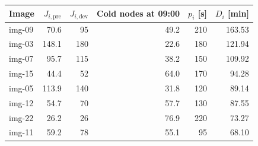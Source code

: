 \begin{tabular}{lrrrrr}
\toprule
Image & \(J_{i,\mathrm{pre}}\) & \(J_{i,\mathrm{dev}}\) & Cold nodes at 09:00 & \(p_i\) [s] & \(D_i\) [min] \\
\midrule
img-09 & 70.6 & 95 & 49.2 & 210 & 163.53 \\
img-03 & 148.1 & 180 & 22.6 & 180 & 121.94 \\
img-07 & 95.7 & 115 & 38.2 & 150 & 109.92 \\
img-15 & 44.4 & 52 & 64.0 & 170 & 94.28 \\
img-05 & 113.9 & 140 & 31.8 & 120 & 89.14 \\
img-12 & 54.7 & 70 & 57.7 & 130 & 87.55 \\
img-22 & 26.2 & 26 & 76.9 & 220 & 73.27 \\
img-11 & 59.2 & 78 & 55.1 & 95 & 68.10 \\
\bottomrule
\end{tabular}

